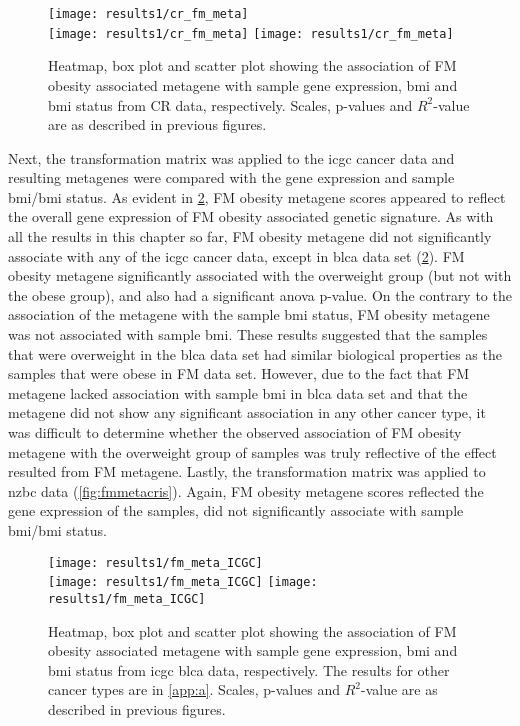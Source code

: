 \begin{figure}[htp!]
	\centering
	\texttt{[image: results1/cr\_fm\_meta]}\\
	\vspace{1em}
	\texttt{[image: results1/cr\_fm\_meta]}
	\hfill
	\texttt{[image: results1/cr\_fm\_meta]}
	\caption[FM metagene in CR data]{Heatmap, box plot and scatter plot showing the association of FM obesity associated metagene with sample gene expression, \gls{bmi} and \gls{bmi} status from CR  data, respectively.
	Scales, p-values and $R^2$-value are as described in previous figures.}
	\label{fig:fmmetacr}
\end{figure}

Next, the transformation matrix was applied to the \gls{icgc} cancer data and resulting metagenes were compared with the gene expression and sample \gls{bmi}/\gls{bmi} status.
As evident in \cref{fig:fmmetaicgc}, FM obesity metagene scores appeared to reflect the overall gene expression of FM obesity associated genetic signature.
As with all the results in this chapter so far, FM obesity metagene did not significantly associate with any of the \gls{icgc} cancer data, except in \gls{blca} data set (\cref{fig:fmmetaicgc}).
FM obesity metagene significantly associated with the overweight group (but not with the obese group), and also had a significant \gls{anova} p-value.
On the contrary to the association of the metagene with the sample \gls{bmi} status, FM obesity metagene was not associated with sample \gls{bmi}.
These results suggested that the samples that were overweight in the \gls{blca} data set had similar biological properties as the samples that were obese in FM data set.
However, due to the fact that FM metagene lacked association with sample \gls{bmi} in \gls{blca} data set and that the metagene did not show any significant association in any other cancer type, it was difficult to determine whether the observed association of FM obesity metagene with the overweight group of samples was truly reflective of the effect resulted from FM metagene.
Lastly, the transformation matrix was applied to \gls{nzbc} data (\cref{fig:fmmetacris}).
Again, FM obesity metagene scores reflected the gene expression of the samples, did not significantly associate with sample \gls{bmi}/\gls{bmi} status.
\\

\begin{figure}[htp!]
	\centering
	\texttt{[image: results1/fm\_meta\_ICGC]}\\
	\vspace{1em}
	\texttt{[image: results1/fm\_meta\_ICGC]}
	\hfill
	\texttt{[image: results1/fm\_meta\_ICGC]}
	\caption[FM metagene in \acrshort{icgc} \acrshort{blca} data]{Heatmap, box plot and scatter plot showing the association of FM obesity associated metagene with sample gene expression, \gls{bmi} and \gls{bmi} status from \acrshort{icgc} \acrshort{blca} data, respectively.
	The results for other cancer types are in \cref{app:a}.
	Scales, p-values and $R^2$-value are as described in previous figures.}
	\label{fig:fmmetaicgc}
\end{figure}

